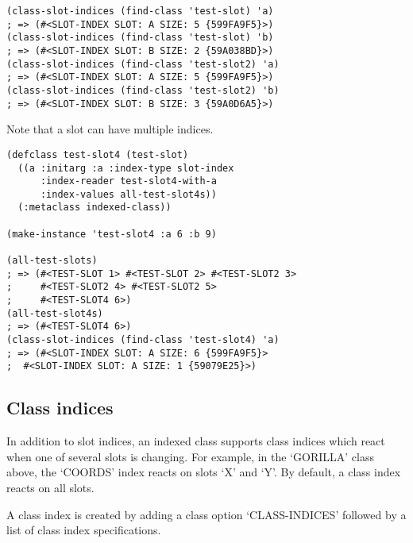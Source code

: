 \begin{Verbatim}[fontsize=\small,frame=leftline,framerule=0.9mm,rulecolor=\color{gray},framesep=5.1mm,xleftmargin=5mm,fontfamily=cmtt]
(class-slot-indices (find-class 'test-slot) 'a)
; => (#<SLOT-INDEX SLOT: A SIZE: 5 {599FA9F5}>)
(class-slot-indices (find-class 'test-slot) 'b)
; => (#<SLOT-INDEX SLOT: B SIZE: 2 {59A038BD}>)
(class-slot-indices (find-class 'test-slot2) 'a)
; => (#<SLOT-INDEX SLOT: A SIZE: 5 {599FA9F5}>)
(class-slot-indices (find-class 'test-slot2) 'b)
; => (#<SLOT-INDEX SLOT: B SIZE: 3 {59A0D6A5}>)
\end{Verbatim}
Note that a slot can have multiple indices.

\begin{Verbatim}[fontsize=\small,frame=leftline,framerule=0.9mm,rulecolor=\color{gray},framesep=5.1mm,xleftmargin=5mm,fontfamily=cmtt]
(defclass test-slot4 (test-slot)
  ((a :initarg :a :index-type slot-index
      :index-reader test-slot4-with-a
      :index-values all-test-slot4s))
  (:metaclass indexed-class))

(make-instance 'test-slot4 :a 6 :b 9)

(all-test-slots)
; => (#<TEST-SLOT 1> #<TEST-SLOT 2> #<TEST-SLOT2 3>
;     #<TEST-SLOT2 4> #<TEST-SLOT2 5>
;     #<TEST-SLOT4 6>)
(all-test-slot4s)
; => (#<TEST-SLOT4 6>)
(class-slot-indices (find-class 'test-slot4) 'a)
; => (#<SLOT-INDEX SLOT: A SIZE: 6 {599FA9F5}>
;  #<SLOT-INDEX SLOT: A SIZE: 1 {59079E25}>)
\end{Verbatim}


\subsection{ Class indices}

In addition to slot indices, an indexed class supports class
indices which react when one of several slots is changing. For
example, in the `GORILLA' class above, the `COORDS' index reacts
on slots `X' and `Y'. By default, a class index reacts on all
slots.

A class index is created by adding a class option `CLASS-INDICES'
followed by a list of class index specifications.

